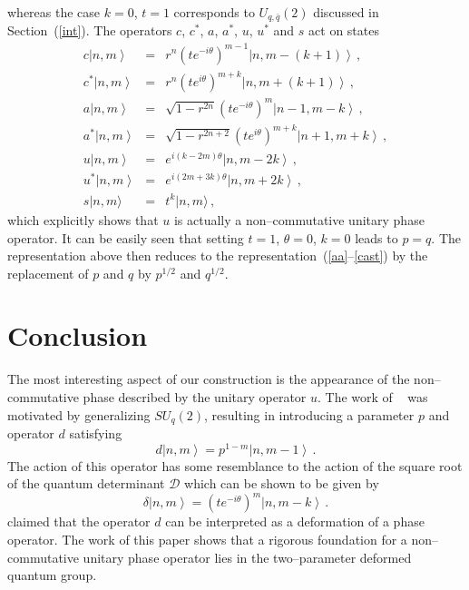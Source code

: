 \documentclass[a4paper,12pt]{article}
\numberwithin{equation}{section}
\begin{document}
 whereas the case $k = 0$, $t = 1$ corresponds to $U_{q,\bar q} \left( 2 \right)$ discussed in Section~(\ref{int}).
The operators $c$, $c^\ast$, $a$, $a^\ast$, $u$, $u^\ast$ and $s$ act on states
\begin{eqnarray}
c \left| n,m \right \rangle & = & r^n \left( t e^{-i \theta} \right)^{m - 1}
 \left| n,m - \left( k + 1 \right) \right \rangle \, , \\
c^\ast \left| n,m \right \rangle & = & r^n \left( t e^{i \theta} \right)^{m + k}
 \left| n,m + \left( k + 1 \right) \right \rangle \, , \\
a \left| n,m \right \rangle & = & \sqrt{1 - r^{2n}} \left( t e^{-i \theta} \right)^m
 \left| n - 1, m - k \right \rangle \, , \\
a^\ast \left| n,m \right \rangle & = & \sqrt{1 - r^{2n + 2}}
 \left( t e^{i \theta} \right)^{m + k} \left| n + 1, m + k \right \rangle \, , \\
u \left| n ,m \right \rangle & = & e^{i \left( k -2m \right) \theta}
 \left| n, m - 2k \right \rangle \, , \\
u^\ast \left| n,m \right \rangle & = & e^{i \left( 2m +3k \right) \theta}
 \left| n, m+2k \right \rangle  \, , \\
s|n,m \rangle &=& t^k |n,m \rangle \, , 
\end{eqnarray}
which explicitly shows that $u$ is actually a non--commutative unitary phase operator.
 It can be easily seen that setting $t = 1$, $\theta = 0$, $k = 0$ leads to $p = q$.
 The representation above then reduces to the representation~(\ref{aa}--\ref{cast}) by the replacement of $p$ and $q$ by $p^{1/2}$ and $q^{1/2}$.
\section{Conclusion}
The most interesting aspect of our construction is the appearance of the non--commutative phase
 described by the unitary operator $u$. The work of ~\cite{Ari} was
 motivated by generalizing $SU_q \left( 2 \right)$, resulting in
 introducing a parameter $p$ and operator $d$ satisfying
 \begin{equation}
 d \left| n , m \right \rangle = p^{1 - m} \left| n , m - 1 \right \rangle \, .
 \end{equation}
 The action of this operator has some resemblance to the action of
 the square root of the quantum determinant $\mathcal{D}$ which can be shown to be given by
 \begin{equation}
  \delta \left| n ,m \right \rangle  = \left( t e^{-i \theta} \right)^m  \left| n, m-k \right \rangle \, .
 \end{equation}
 \cite{Ari} claimed that the operator $d$ can be interpreted as a deformation
 of a phase operator. The work of this paper shows that a rigorous foundation
 for a non--commutative unitary phase operator lies in the two--parameter
 deformed quantum group.
\end{document}
